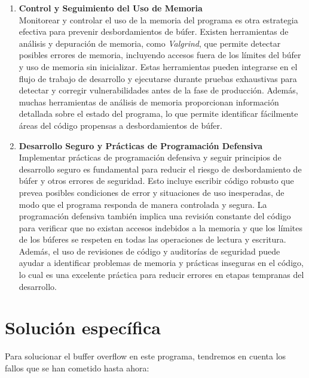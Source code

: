 \begin{enumerate}
    \item \textbf{Control y Seguimiento del Uso de Memoria}
    \\
    Monitorear y controlar el uso de la memoria del programa es otra estrategia efectiva para prevenir desbordamientos de búfer. Existen herramientas de análisis y depuración de memoria, como \textit{Valgrind}, que permite detectar posibles errores de memoria, incluyendo accesos fuera de los límites del búfer y uso de memoria sin inicializar. Estas herramientas pueden integrarse en el flujo de trabajo de desarrollo y ejecutarse durante pruebas exhaustivas para detectar y corregir vulnerabilidades antes de la fase de producción. Además, muchas herramientas de análisis de memoria proporcionan información detallada sobre el estado del programa, lo que permite identificar fácilmente áreas del código propensas a desbordamientos de búfer.

    \item \textbf{Desarrollo Seguro y Prácticas de Programación Defensiva}
    \\
    Implementar prácticas de programación defensiva y seguir principios de desarrollo seguro es fundamental para reducir el riesgo de desbordamiento de búfer y otros errores de seguridad. Esto incluye escribir código robusto que prevea posibles condiciones de error y situaciones de uso inesperadas, de modo que el programa responda de manera controlada y segura. La programación defensiva también implica una revisión constante del código para verificar que no existan accesos indebidos a la memoria y que los límites de los búferes se respeten en todas las operaciones de lectura y escritura. Además, el uso de revisiones de código y auditorías de seguridad puede ayudar a identificar problemas de memoria y prácticas inseguras en el código, lo cual es una excelente práctica para reducir errores en etapas tempranas del desarrollo.

\end{enumerate}


\section{Solución específica}
\noindent Para solucionar el buffer overflow en este programa, tendremos en cuenta los fallos que se han cometido hasta ahora:

